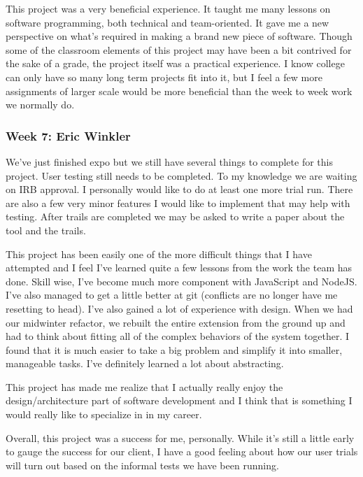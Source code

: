 This project was a very beneficial experience. It taught me many lessons on software programming, both technical and team-oriented. It gave me a new perspective on what's required in making a brand new piece of software. Though some of the classroom elements of this project may have been a bit contrived for the sake of a grade, the project itself was a practical experience. I know college can only have so many long term projects fit into it, but I feel a few more assignments of larger scale would be more beneficial than the week to week work we normally do. \\ 



 

 \subsubsection{Week 7: Eric Winkler}

We've just finished expo but we still have several things to complete for this project. User testing still needs to be completed. To my knowledge we are waiting on IRB approval. I personally would like to do at least one more trial run. There are also a few very minor features I would like to implement that may help with testing. After trails are completed we may be asked to write a paper about the tool and the trails.



This project has been easily one of the more difficult things that I have attempted and I feel I've learned quite a few lessons from the work the team has done. Skill wise, I’ve become much more component with JavaScript and NodeJS. I’ve also managed to get a little better at git (conflicts are no longer have me resetting to head). I’ve also gained a lot of experience with design. When we had our midwinter refactor, we rebuilt the entire extension from the ground up and had to think about fitting all of the complex behaviors of the system together. I found that it is much easier to take a big problem and simplify it into smaller, manageable tasks. I’ve definitely learned a lot about abstracting.



This project has made me realize that I actually really enjoy the design/architecture part of software development and I think that is something I would really like to specialize in in my career. 



Overall, this project was a success for me, personally. While it’s still a little early to gauge the success for our client, I have a good feeling about how our user trials will turn out based on the informal tests we have been running.

 

 